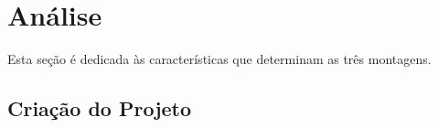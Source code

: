 \section {Análise}

Esta seção é dedicada às características que determinam as três montagens.

\subsection{Criação do Projeto}